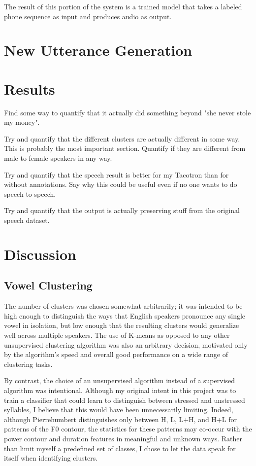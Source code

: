 \documentclass{article}
\begin{document}
The result of this portion of the system is a trained model that takes a labeled phone sequence as input and produces audio as output.

\section{New Utterance Generation}
\label{sec:newuttgen}



\section{Results}
\label{sec:results}

Find some way to quantify that it actually did something beyond "she never stole my money".

Try and quantify that the different clusters are actually different in some way. This is probably the most important section. Quantify if they are different from male to female speakers in any way.

Try and quantify that the speech result is better for my Tacotron than for without annotations. Say why this could be useful even if no one wants to do speech to speech.

Try and quantify that the output is actually preserving stuff from the original speech dataset.

\section{Discussion}
\label{sec:discussion}

\subsection{Vowel Clustering}
\label{ssec:discussvowels}

The number of clusters was chosen somewhat arbitrarily; it was intended to be high enough to distinguish the ways that English speakers pronounce any single vowel in isolation, but low enough that the resulting clusters would generalize well across multiple speakers.
The use of K-means as opposed to any other unsupervised clustering algorithm was also an arbitrary decision, motivated only by the algorithm's speed and overall good performance on a wide range of clustering tasks.

By contrast, the choice of an unsupervised algorithm instead of a supervised algorithm was intentional.
Although my original intent in this project was to train a classifier that could learn to distinguish between stressed and unstressed syllables, I believe that this would have been unnecessarily limiting.
Indeed, although Pierrehumbert \cite{pierrehumbert1980phonology} distinguishes only between H, L, L+H, and H+L for patterns of the F0 contour, the statistics for these patterns may co-occur with the power contour and duration features in meaningful and unknown ways. Rather than limit myself a predefined set of classes, I chose to let the data speak for itself when identifying clusters.
\end{document}
